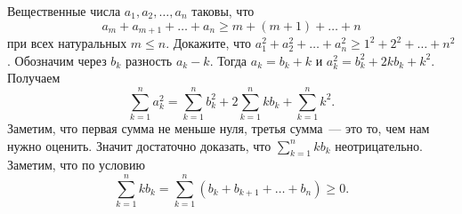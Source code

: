 \problem
Вещественные числа $a_1, a_2, \ldots, a_n$ таковы, что
\[
    a_m + a_{m + 1} + \ldots + a_n
\geq
    m + (m + 1) + \ldots + n
\]
при всех натуральных $m \leq n$.
Докажите, что $a_1^2 + a_2^2 + \ldots + a_n^2 \geq 1^2 + 2^2 + \ldots + n^2$.
\solution
Обозначим через $b_k$ разность $a_k - k$.
Тогда $a_k = b_k + k$ и $a_k^2 = b_k^2 + 2 k b_k + k^2$.
Получаем
\[
    \sum_{k = 1}^{n}
        a_k^2
=
    \sum_{k = 1}^n
        b_k^2
    +
    2 \sum_{k = 1}^{n}
        k b_k
    +
    \sum_{k = 1}^n
        k^2
.\]
Заметим, что первая сумма не меньше нуля, третья сумма~--- это то, чем нам
нужно оценить.
Значит достаточно доказать, что $\sum_{k = 1}^{n} k b_k$ неотрицательно.
Заметим, что по условию
\[
    \sum_{k = 1}^{n}
        k b_k
=
    \sum_{k = 1}^{n}
        (b_k + b_{k+1} + \ldots + b_n)
\geq
    0
.\]
\endproblem
